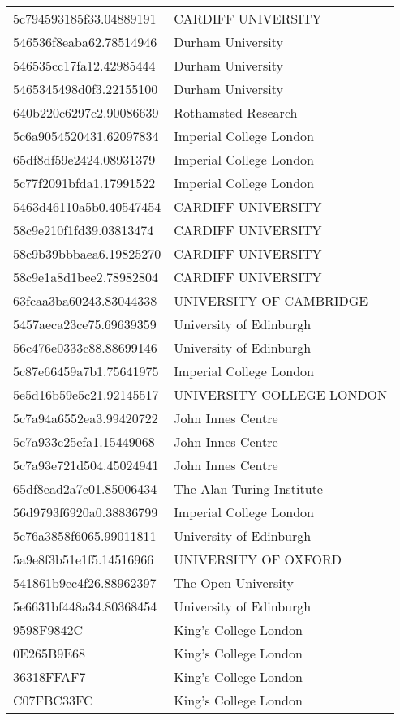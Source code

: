 \begin{tabular}{ll}
5c794593185f33.04889191 & CARDIFF UNIVERSITY \\
546536f8eaba62.78514946 & Durham University \\
546535cc17fa12.42985444 & Durham University \\
5465345498d0f3.22155100 & Durham University \\
640b220c6297c2.90086639 & Rothamsted Research \\
5c6a9054520431.62097834 & Imperial College London \\
65df8df59e2424.08931379 & Imperial College London \\
5c77f2091bfda1.17991522 & Imperial College London \\
5463d46110a5b0.40547454 & CARDIFF UNIVERSITY \\
58c9e210f1fd39.03813474 & CARDIFF UNIVERSITY \\
58c9b39bbbaea6.19825270 & CARDIFF UNIVERSITY \\
58c9e1a8d1bee2.78982804 & CARDIFF UNIVERSITY \\
63fcaa3ba60243.83044338 & UNIVERSITY OF CAMBRIDGE \\
5457aeca23ce75.69639359 & University of Edinburgh \\
56c476e0333c88.88699146 & University of Edinburgh \\
5c87e66459a7b1.75641975 & Imperial College London \\
5e5d16b59e5c21.92145517 & UNIVERSITY COLLEGE LONDON \\
5c7a94a6552ea3.99420722 & John Innes Centre \\
5c7a933c25efa1.15449068 & John Innes Centre \\
5c7a93e721d504.45024941 & John Innes Centre \\
65df8ead2a7e01.85006434 & The Alan Turing Institute \\
56d9793f6920a0.38836799 & Imperial College London \\
5c76a3858f6065.99011811 & University of Edinburgh \\
5a9e8f3b51e1f5.14516966 & UNIVERSITY OF OXFORD \\
541861b9ec4f26.88962397 & The Open University \\
5e6631bf448a34.80368454 & University of Edinburgh \\
9598F9842C & King's College London \\
0E265B9E68 & King's College London \\
36318FFAF7 & King's College London \\
C07FBC33FC & King's College London \\

\end{tabular}
